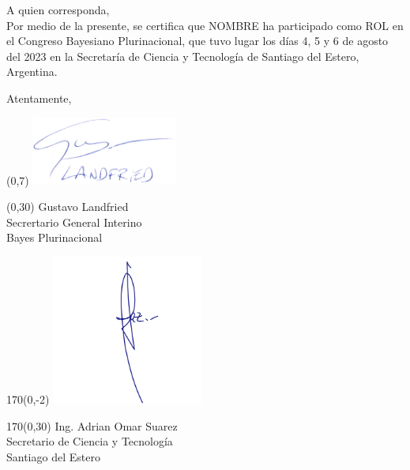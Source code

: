 \documentclass[a4paper,11pt]{letter}
\begin{document}
\begin{letter}
\noindent A quien corresponda, \\ [0.3cm]

\hspace{1cm} Por medio de la presente, se certifica que NOMBRE ha participado como ROL en el Congreso Bayesiano Plurinacional, que tuvo lugar los días 4, 5 y 6 de agosto del 2023 en la Secretaría de Ciencia y Tecnología de Santiago del Estero, Argentina.

Atentamente,

\vspace{1.3cm}

\begin{textblock}{80}(0,7)
\phantom{.} \hfill \includegraphics[width=4.8cm]{firma.png}\hspace{2cm}\phantom{.} \\[0cm]
\end{textblock}
\begin{textblock}{80}(0,30)
 \phantom{.} \hfill Gustavo Landfried \hspace{2.5cm}\phantom{.}\\ \small
\phantom{.} \hfill Secrertario General Interino \hspace{2.5cm}\phantom{.}\\
\phantom{.} \hfill Bayes Plurinacional \hspace{2.5cm}\phantom{.}\\
\end{textblock}

\begin{textblock}{170}(0,-2)
\phantom{.} \hfill \includegraphics[width=5cm]{secretarioCyT.png}\hspace{2cm}\phantom{.} \\[-2cm]
\end{textblock}
\begin{textblock}{170}(0,30)
 \phantom{.} \hfill Ing. Adrian Omar Suarez \hspace{2.5cm}\phantom{.}\\ \small
\phantom{.} \hfill Secretario de Ciencia y Tecnología \hspace{2.5cm}\phantom{.}\\
\phantom{.} \hfill Santiago del Estero \hspace{2.5cm}\phantom{.}\\
\end{textblock}



\end{letter}
\end{document}
